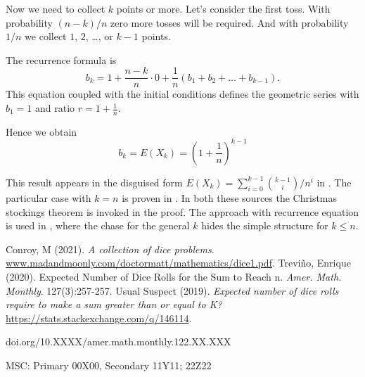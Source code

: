 \documentclass{article}
\theoremstyle{plain}
\begin{document}
\begin{filler}
Now we need to collect $k$ points or more. Let's consider the first toss.
With probability $(n - k)/n$ zero more tosses will be required. 
And with probability $1/n$ we collect $1$, $2$, \ldots, or $k-1$ points.

The recurrence formula is
\[
b_k = 1 + \frac{n - k}{n} \cdot 0 + \frac{1}{n} (b_1 + b_2 + \ldots + b_{k-1}).
\]
This equation coupled with the initial conditions defines the geometric series with $b_1 = 1$ and ratio $r = 1 + \frac{1}{n}$.

Hence we obtain
\[
b_k = E(X_k) = \left( 1 + \frac{1}{n} \right)^{k-1}
\]


This result appears in the disguised form $E(X_k) = \sum_{i=0}^{k-1} \binom{k-1}{i} / n^i$ in \cite{conroy2021collection}.
The particular case with $k=n$ is proven in \cite{trevino2020expected}.
In both these sources the Christmas stockings theorem is invoked in the proof. 
The approach with recurrence equation is used in \cite{146114}, 
where the chase for the general $k$ hides the simple structure for $k\leq n$. 


\begin{thebibliography}{1}
 Conroy, M (2021). \textit{A collection of dice problems}. \url{www.madandmoonly.com/doctormatt/mathematics/dice1.pdf}.
 Trevi{\~n}o, Enrique (2020). Expected Number of Dice Rolls for the Sum to Reach n. \textit{Amer. Math. Monthly}. 127(3):257-257.
 Usual Suspect (2019). \textit{Expected number of dice rolls require to make a sum greater than or equal to K?} \url{https://stats.stackexchange.com/q/146114}.
\end{thebibliography}




\bigskip
\footnoterule
\footnotesize{doi.org/10.XXXX/amer.math.monthly.122.XX.XXX}

\footnotesize{MSC: Primary 00X00, Secondary 11Y11; 22Z22}

\end{filler}
\end{document}
